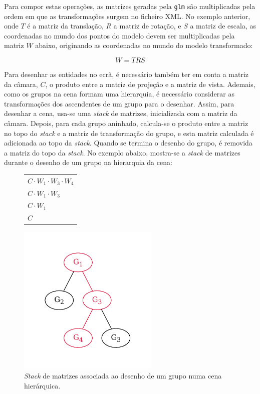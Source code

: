 \documentclass[12pt, a4paper]{article}
\begin{document}
Para compor estas operações, as matrizes geradas pela \texttt{glm} são multiplicadas pela ordem em
que as transformações surgem no ficheiro XML. No exemplo anterior, onde $T$ é a matriz da
translação, $R$ a matriz de rotação, e $S$ a matriz de escala, as coordenadas no mundo dos pontos do
modelo devem ser multiplicadas pela matriz $W$ abaixo, originando as coordenadas no mundo do modelo
transformado:

$$
W = T R S
$$

Para desenhar as entidades no ecrã, é necessário também ter em conta a matriz da câmara, $C$, o
produto entre a matriz de projeção e a matriz de vista. Ademais, como os grupos na cena formam uma
hierarquia, é necessário considerar as transformações dos ascendentes de um grupo para o desenhar.
Assim, para desenhar a cena, usa-se uma \emph{stack} de matrizes, inicializada com a matriz da
câmara. Depois, para cada grupo aninhado, calcula-se o produto entre a matriz no topo do
\emph{stack} e a matriz de transformação do grupo, e esta matriz calculada é adicionada ao topo da
\emph{stack}. Quando se termina o desenho do grupo, é removida a matriz do topo da \emph{stack}. No
exemplo abaixo, mostra-se a \emph{stack} de matrizes durante o desenho de um grupo na hierarquia da
cena:

\begin{figure}[h]
    \begin{minipage}{0.5\textwidth}
        \centering
        \begin{tabular}{|>{\centering\arraybackslash}m{3cm}|}
            \hline \\
            \hline $C \cdot W_1 \cdot W_3 \cdot W_4$ \\
            \hline $C \cdot W_1 \cdot W_3$ \\
            \hline $C \cdot W_1$ \\
            \hline $C$ \\
            \hline
        \end{tabular}
    \end{minipage}
    \begin{minipage}{0.5\textwidth}
        \centering
        \includegraphics[width=0.6\textwidth]{res/phase2/SceneGraph.pdf}
    \end{minipage}
    \caption{\emph{Stack} de matrizes associada ao desenho de um grupo numa cena hierárquica.}
\end{figure}
\end{document}
